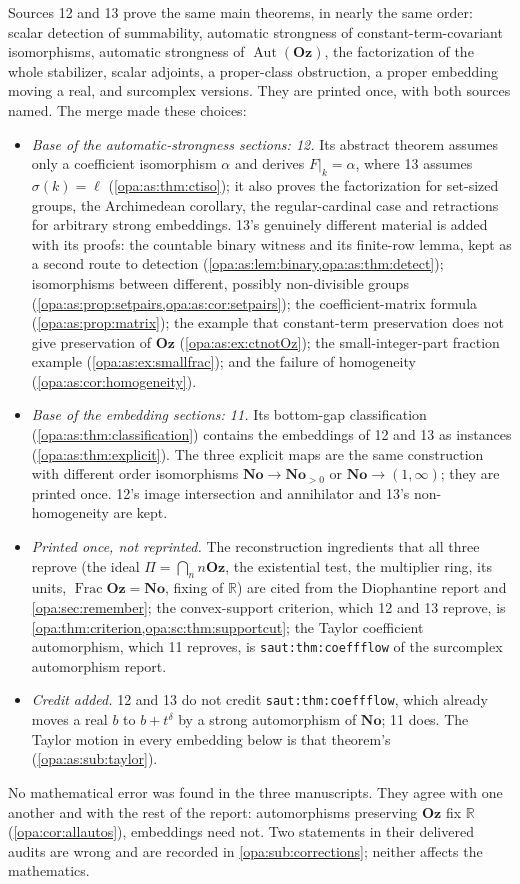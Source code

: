\documentclass[11pt,oneside]{article}
\numberwithin{equation}{section}
\theoremstyle{definition}
\theoremstyle{remark}
\newcommand{\No}{\mathbf{No}}
\newcommand{\Oz}{\mathbf{Oz}}
\newcommand{\R}{\mathbb R}
\newcommand{\Aut}{\operatorname{Aut}}
\newcommand{\Frac}{\operatorname{Frac}}
\newcommand{\lbl}[1]{\nolinkurl{#1}}
\begin{document}
Sources 12 and 13 prove the same main theorems, in nearly the same order: scalar
detection of summability, automatic strongness of constant-term-covariant
isomorphisms, automatic strongness of $\Aut(\Oz)$, the factorization of the whole
stabilizer, scalar adjoints, a proper-class obstruction, a proper embedding moving a
real, and surcomplex versions. They are printed once, with both sources named. The
merge made these choices:
\begin{itemize}[itemsep=2pt]
\item \emph{Base of the automatic-strongness sections: 12.} Its abstract theorem
assumes only a coefficient isomorphism $\alpha$ and derives $F|_k=\alpha$, where 13
assumes $\sigma(k)=\ell$ (\cref{opa:as:thm:ctiso}); it also proves the factorization
for set-sized groups, the Archimedean corollary, the regular-cardinal case and
retractions for arbitrary strong embeddings. 13's genuinely different material is
added with its proofs: the countable binary witness and its finite-row lemma, kept
as a second route to detection (\cref{opa:as:lem:binary,opa:as:thm:detect});
isomorphisms between different, possibly non-divisible groups
(\cref{opa:as:prop:setpairs,opa:as:cor:setpairs}); the coefficient-matrix formula
(\cref{opa:as:prop:matrix}); the example that constant-term preservation does not
give preservation of $\Oz$ (\cref{opa:as:ex:ctnotOz}); the small-integer-part
fraction example (\cref{opa:as:ex:smallfrac}); and the failure of homogeneity
(\cref{opa:as:cor:homogeneity}).
\item \emph{Base of the embedding sections: 11.} Its bottom-gap classification
(\cref{opa:as:thm:classification}) contains the embeddings of 12 and 13 as instances
(\cref{opa:as:thm:explicit}). The three explicit maps are the same construction with
different order isomorphisms $\No\to\No_{>0}$ or $\No\to(1,\infty)$; they are printed
once. 12's image intersection and annihilator and 13's non-homogeneity are kept.
\item \emph{Printed once, not reprinted.} The reconstruction ingredients that all
three reprove (the ideal $\Pi=\bigcap_nn\Oz$, the existential test, the multiplier
ring, its units, $\Frac\Oz=\No$, fixing of $\R$) are cited from the Diophantine
report and \cref{opa:sec:remember}; the convex-support criterion, which 12 and 13
reprove, is \cref{opa:thm:criterion,opa:sc:thm:supportcut}; the Taylor coefficient
automorphism, which 11 reproves, is \lbl{saut:thm:coeffflow} of the surcomplex
automorphism report.
\item \emph{Credit added.} 12 and 13 do not credit \lbl{saut:thm:coeffflow}, which
already moves a real $b$ to $b+t^\delta$ by a strong automorphism of $\No$; 11 does.
The Taylor motion in every embedding below is that theorem's
(\cref{opa:as:sub:taylor}).
\end{itemize}
No mathematical error was found in the three manuscripts. They agree with one
another and with the rest of the report: automorphisms preserving $\Oz$ fix $\R$
(\cref{opa:cor:allautos}), embeddings need not. Two statements in their delivered
audits are wrong and are recorded in \cref{opa:sub:corrections}; neither affects the
mathematics.
\end{document}
